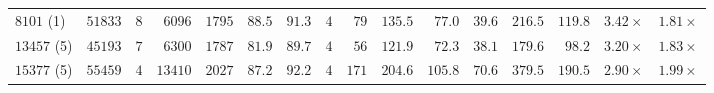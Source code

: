 \begin{table}[t]
{\begin{tabular}{@{}lrrrrrrc|r|rrr|rr|rr@{}}
$8101$ (1) & $51833$ & $8$ & $6096$ & $1795$ & $88.5$ & $91.3$ & $4$ & $79$ & $135.5$ & $77.0$ & \cellcolor{green!15}$\mathbf{39.6}$ & $216.5$ & \cellcolor{green!15}$\mathbf{119.8}$ & \cellcolor{green!15}$\mathbf{3.42\times}$ & \cellcolor{green!15}$\mathbf{1.81\times}$\\
$13457$ (5) & $45193$ & $7$ & $6300$ & $1787$ & $81.9$ & $89.7$ & $4$ & $56$ & $121.9$ & $72.3$ & \cellcolor{green!15}$\mathbf{38.1}$ & $179.6$ & \cellcolor{green!15}$\mathbf{98.2}$ & \cellcolor{green!15}$\mathbf{3.20\times}$ & \cellcolor{green!15}$\mathbf{1.83\times}$\\
$15377$ (5) & $55459$ & $4$ & $13410$ & $2027$ & $87.2$ & $92.2$ & $4$ & $171$ & $204.6$ & $105.8$ & \cellcolor{green!15}$\mathbf{70.6}$ & $379.5$ & \cellcolor{green!15}$\mathbf{190.5}$ & \cellcolor{green!15}$\mathbf{2.90\times}$ & \cellcolor{green!15}$\mathbf{1.99\times}$\\
\bottomrule\end{tabular}}\end{table}

